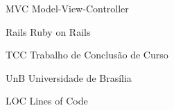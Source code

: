 \begin{siglas}
  
  \item[MVC] Model-View-Controller
  \item[Rails] Ruby on Rails
  \item[TCC] Trabalho de Conclusão de Curso
  \item[UnB] Universidade de Brasília
  \item[LOC] Lines of Code
\end{siglas}

